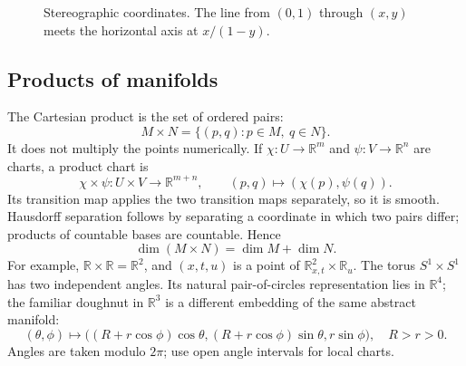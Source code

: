 \documentclass[11pt,a4paper]{article}
\numberwithin{equation}{section}
\theoremstyle{definition}
\theoremstyle{plain}
\theoremstyle{remark}
\newcommand{\R}{\mathbb R}
\begin{document}
\begin{figure}[htbp]\centering
{}
\caption{Stereographic coordinates. The line from $(0,1)$ through $(x,y)$ meets the horizontal axis at $x/(1-y)$.}
\end{figure}

\subsection{Products of manifolds}\label{sec:products}
The Cartesian product is the set of ordered pairs:
\[
M\times N=\{(p,q):p\in M,\ q\in N\}.
\]
It does not multiply the points numerically. If $\chi:U\to\R^m$ and $\psi:V\to\R^n$ are charts, a product chart is
\[
\chi\times\psi:U\times V\longrightarrow\R^{m+n},\qquad
(p,q)\longmapsto(\chi(p),\psi(q)).
\]
Its transition map applies the two transition maps separately, so it is smooth. Hausdorff separation follows by separating a coordinate in which two pairs differ; products of countable bases are countable. Hence
\[
\boxed{\dim(M\times N)=\dim M+\dim N.}
\]
For example, $\R\times\R=\R^2$, and $(x,t,u)$ is a point of $\R^2_{x,t}\times\R_u$. The torus $S^1\times S^1$ has two independent angles. Its natural pair-of-circles representation lies in $\R^4$; the familiar doughnut in $\R^3$ is a different embedding of the same abstract manifold:
\[
(\theta,\phi)\longmapsto
\bigl((R+r\cos\phi)\cos\theta,(R+r\cos\phi)\sin\theta,r\sin\phi\bigr),
\quad R>r>0.
\]
Angles are taken modulo $2\pi$; use open angle intervals for local charts.
\end{document}
